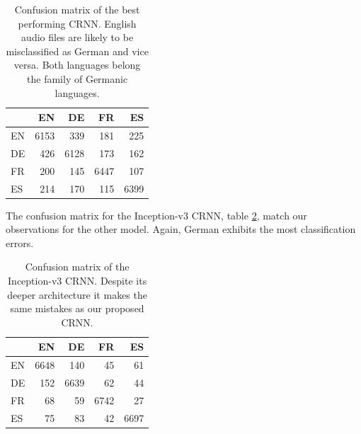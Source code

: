 	
	\begin{table}[]
	\centering
	\begin{tabularx}{\textwidth}{l|rrrr}
	      & EN     & DE     & FR     & ES \\ \midrule
	  EN  & 6153   & 339    & 181    & 225 \\
	  DE  & 426    & 6128   & 173    & 162 \\
	  FR  & 200    & 145    & 6447   & 107 \\
	  ES  & 214    & 170    & 115    & 6399 \\
	\end{tabularx}
	\caption{Confusion matrix of the best performing CRNN. English audio files are likely to be misclassified as German and vice versa. Both languages belong the family of Germanic languages. }
	\label{tab:language_family_crnn}
	\end{table}

	The confusion matrix for the Inception-v3 CRNN, table \ref{tab:language_family_inception}, match our observations for the other model. Again, German exhibits the most classification errors. 
	
	\begin{table}[]
	\centering
	\begin{tabularx}{\textwidth}{l|rrrr}
	      & EN     & DE     & FR     & ES \\ \midrule
	  EN  & 6648   & 140    & 45     & 61 \\
	  DE  & 152    & 6639   & 62     & 44 \\
	  FR  & 68     & 59     & 6742   & 27 \\
	  ES  & 75     & 83     & 42     & 6697 \\
	\end{tabularx}
	\caption{Confusion matrix of the Inception-v3 CRNN. Despite its deeper architecture it makes the same mistakes as our proposed CRNN. }
	\label{tab:language_family_inception}
	\end{table}
 

